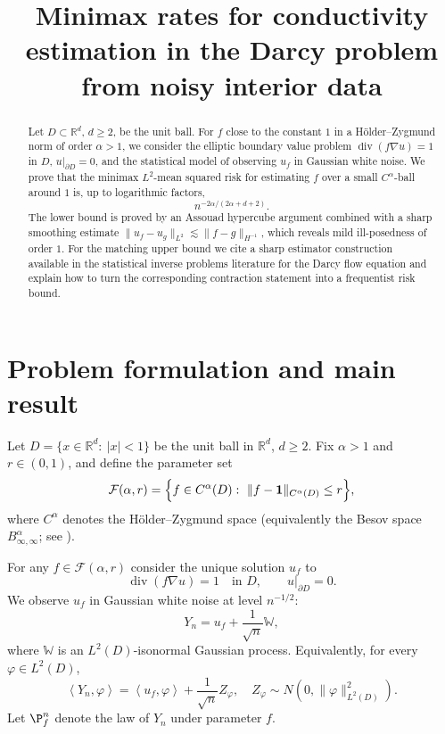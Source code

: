 \documentclass[11pt]{article}
\theoremstyle{definition}
\theoremstyle{remark}
\DeclareMathOperator{\diver}{div}
\newcommand{\R}{\mathbb{R}}
\newcommand{\1}{\mathbf{1}}
\newcommand{\ip}[2]{\left\langle #1,#2\right\rangle}
\begin{document}
\title{Minimax rates for conductivity estimation in the Darcy problem from noisy interior data}
\author{}
\date{}
\maketitle

\begin{abstract}
Let $D\subset\R^d$, $d\ge2$, be the unit ball. For $f$ close to the constant $1$ in a H\"older--Zygmund norm of order $\alpha>1$, we consider the elliptic boundary value problem $\diver(f\nabla u)=1$ in $D$, $u|_{\partial D}=0$, and the statistical model of observing $u_f$ in Gaussian white noise.
We prove that the minimax $L^2$-mean squared risk for estimating $f$ over a small $C^\alpha$-ball around $1$ is, up to logarithmic factors,
\[
n^{-2\alpha/(2\alpha+d+2)}.
\]
The lower bound is proved by an Assouad hypercube argument combined with a sharp smoothing estimate $\|u_f-u_g\|_{L^2}\lesssim\|f-g\|_{H^{-1}}$, which reveals mild ill-posedness of order $1$.
For the matching upper bound we cite a sharp estimator construction available in the statistical inverse problems literature for the Darcy flow equation and explain how to turn the corresponding contraction statement into a frequentist risk bound.
\end{abstract}

\section{Problem formulation and main result}

Let $D=\{x\in\R^d:\ |x|<1\}$ be the unit ball in $\R^d$, $d\ge2$. Fix $\alpha>1$ and $r\in(0,1)$, and define the parameter set
\[
\mathcal F(\alpha,r)=\Bigl\{f\in C^\alpha(D):\ \|f-\1\|_{C^\alpha(D)}\le r\Bigr\},
\]
where $C^\alpha$ denotes the H\"older--Zygmund space (equivalently the Besov space $B_{\infty,\infty}^\alpha$; see \cite[Ch.~2]{Triebel2006}).

For any $f\in\mathcal F(\alpha,r)$ consider the unique solution $u_f$ to
\begin{equation}\label{eq:darcy}
\diver(f\nabla u)=1\quad\text{in }D,\qquad u|_{\partial D}=0.
\end{equation}
We observe $u_f$ in Gaussian white noise at level $n^{-1/2}$:
\begin{equation}\label{eq:whitenoise}
Y_n=u_f+\frac1{\sqrt n}\mathbb W,
\end{equation}
where $\mathbb W$ is an $L^2(D)$-isonormal Gaussian process. Equivalently, for every $\varphi\in L^2(D)$,
\[
\ip{Y_n}{\varphi}=\ip{u_f}{\varphi}+\frac1{\sqrt n}Z_\varphi,
\quad Z_\varphi\sim N(0,\|\varphi\|_{L^2(D)}^2).
\]
Let $\P_f^n$ denote the law of $Y_n$ under parameter $f$.
\end{document}
